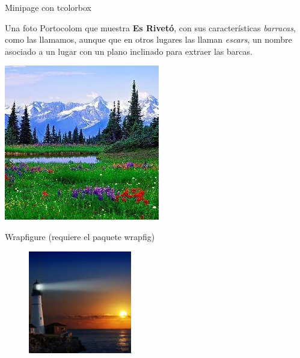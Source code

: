 \documentclass{beamer}
\begin{document}
\begin{frame}{Minipage con tcolorbox}
\begin{tcolorbox}
\begin{minipage}[l]{0.45\textwidth}
Una foto Portocolom que muestra {\bf Es Rivetó}, con sus características {\em barracas}, como las llamamos, aunque que en otros lugares las llaman {\em escars}, un nombre asociado a un lugar con un plano inclinado para extraer las barcas.
\end{minipage}
\begin{minipage}[r]{0.45\textwidth}
\includegraphics[width=\textwidth]{paisaje}
\end{minipage}
\end{tcolorbox}
\end{frame}


\begin{frame}{Wrapfigure (requiere el paquete wrapfig)}
\begin{figure}
\begin{center}
\includegraphics[width=0.4\textwidth]{faro.jpg}
\end{center}
\end{figure}
\noindent
{\small \lipsum[0-1]}
\end{frame}
\end{document}
